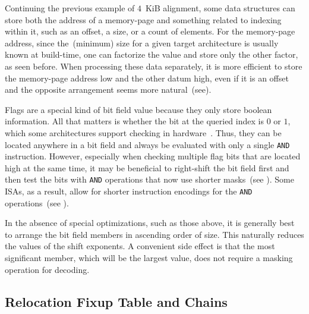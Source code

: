

Continuing the previous example of $4$~KiB alignment, some data structures can store both the address of a \gls{memory-page} and something related to indexing within it, such as an offset, a size, or a count of elements. For the \gls{memory-page} address, since the~(minimum) size for a given target architecture is usually known at build-time, one can factorize the value and store only the other factor, as seen before. When processing these data separately, it is more efficient to store the \gls{memory-page} address low and the other datum high, even if it is an offset and the opposite arrangement seems more natural~(see).

Flags are a special kind of bit field value because they only store boolean information. All that matters is whether the bit at the queried index is $0$ or $1$, which some architectures support checking in hardware~\cite{ia32}. Thus, they can be located anywhere in a bit field and always be evaluated with only a single \texttt{AND} instruction. However, especially when checking multiple flag bits that are located high at the same time, it may be beneficial to right-shift the bit field first and then test the bits with \texttt{AND} operations that now use shorter masks~(see ). Some \glspl{ISA}, as a result, allow for shorter instruction encodings for the \texttt{AND} operations~(see ).



In the absence of special optimizations, such as those above, it is generally best to arrange the bit field members in ascending order of size. This naturally reduces the values of the shift exponents. A convenient side effect is that the most significant member, which will be the largest value, does not require a masking operation for decoding.

\subsection{Relocation Fixup Table and Chains}
\label{sec:reloc_chains}

